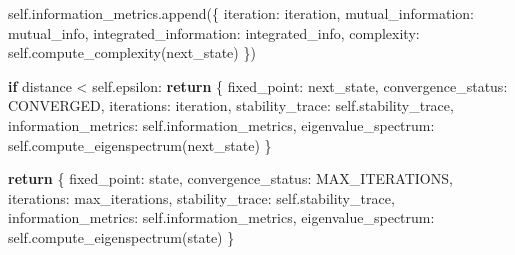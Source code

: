 \documentclass[
]{article}
\newenvironment{Shaded}{}{}
\newcommand{\ControlFlowTok}[1]{\textcolor[rgb]{0.00,0.44,0.13}{\textbf{#1}}}
\newcommand{\NormalTok}[1]{#1}
\newcommand{\OperatorTok}[1]{\textcolor[rgb]{0.40,0.40,0.40}{#1}}
\newcommand{\StringTok}[1]{\textcolor[rgb]{0.25,0.44,0.63}{#1}}
\newcommand{\VariableTok}[1]{\textcolor[rgb]{0.10,0.09,0.49}{#1}}
\begin{document}
\begin{Shaded}
\begin{Highlighting}[]
            \VariableTok{self}\NormalTok{.information\_metrics.append(\{}
                \StringTok{\textquotesingle{}iteration\textquotesingle{}}\NormalTok{: iteration,}
                \StringTok{\textquotesingle{}mutual\_information\textquotesingle{}}\NormalTok{: mutual\_info,}
                \StringTok{\textquotesingle{}integrated\_information\textquotesingle{}}\NormalTok{: integrated\_info,}
                \StringTok{\textquotesingle{}complexity\textquotesingle{}}\NormalTok{: }\VariableTok{self}\NormalTok{.compute\_complexity(next\_state)}
\NormalTok{            \})}

            \ControlFlowTok{if}\NormalTok{ distance }\OperatorTok{\textless{}} \VariableTok{self}\NormalTok{.epsilon:}
                \ControlFlowTok{return}\NormalTok{ \{}
                    \StringTok{\textquotesingle{}fixed\_point\textquotesingle{}}\NormalTok{: next\_state,}
                    \StringTok{\textquotesingle{}convergence\_status\textquotesingle{}}\NormalTok{: }\StringTok{\textquotesingle{}CONVERGED\textquotesingle{}}\NormalTok{,}
                    \StringTok{\textquotesingle{}iterations\textquotesingle{}}\NormalTok{: iteration,}
                    \StringTok{\textquotesingle{}stability\_trace\textquotesingle{}}\NormalTok{: }\VariableTok{self}\NormalTok{.stability\_trace,}
                    \StringTok{\textquotesingle{}information\_metrics\textquotesingle{}}\NormalTok{: }\VariableTok{self}\NormalTok{.information\_metrics,}
                    \StringTok{\textquotesingle{}eigenvalue\_spectrum\textquotesingle{}}\NormalTok{: }\VariableTok{self}\NormalTok{.compute\_eigenspectrum(next\_state)}
\NormalTok{                \}}

        \ControlFlowTok{return}\NormalTok{ \{}
            \StringTok{\textquotesingle{}fixed\_point\textquotesingle{}}\NormalTok{: state,}
            \StringTok{\textquotesingle{}convergence\_status\textquotesingle{}}\NormalTok{: }\StringTok{\textquotesingle{}MAX\_ITERATIONS\textquotesingle{}}\NormalTok{,}
            \StringTok{\textquotesingle{}iterations\textquotesingle{}}\NormalTok{: max\_iterations,}
            \StringTok{\textquotesingle{}stability\_trace\textquotesingle{}}\NormalTok{: }\VariableTok{self}\NormalTok{.stability\_trace,}
            \StringTok{\textquotesingle{}information\_metrics\textquotesingle{}}\NormalTok{: }\VariableTok{self}\NormalTok{.information\_metrics,}
            \StringTok{\textquotesingle{}eigenvalue\_spectrum\textquotesingle{}}\NormalTok{: }\VariableTok{self}\NormalTok{.compute\_eigenspectrum(state)}
\NormalTok{        \}}


\end{Highlighting}
\end{Shaded}
\end{document}
